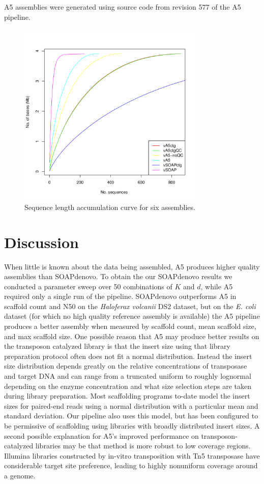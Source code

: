 \documentclass{bioinfo}
\begin{document}
A5 assemblies were generated using source code from revision 577 of the A5 pipeline.

\begin{figure}[t]
\includegraphics[width=3.5in]{volc_accum_plot.pdf}
\vspace{-1cm}
\caption{Sequence length accumulation curve for six assemblies.}\label{fig:03}
\end{figure}

\section{Discussion}

When little is known about the data being assembled, A5 produces higher quality assemblies 
than SOAPdenovo. To obtain the our SOAPdenovo results we conducted a parameter sweep 
over 50 combinations of $K$ and $d$, while A5 required
only a single run of the pipeline.
SOAPdenovo outperforms A5 in scaffold count and N50 on the \textit{Haloferax volcanii} DS2 dataset, but on the \textit{E. coli} dataset 
(for which no high quality reference assembly is available) the
A5 pipeline produces a better assembly when measured by scaffold count, mean scaffold size, and max scaffold size.
One possible reason that A5 may produce better results on the transposon catalyzed library is that the insert size using
that library preparation protocol often does not fit a normal distribution.  Instead the insert size 
distribution depends greatly on the relative concentrations of transposase and target DNA and can range from a truncated uniform
to roughly lognormal depending on the enzyme concentration and what size selection steps are taken during library preparation.
Most scaffolding programs to-date model the insert sizes for paired-end reads using a normal distribution with a particular
mean and standard deviation. Our pipeline also uses this model, but has been configured to be permissive of scaffolding
using libraries with broadly distributed insert sizes.  A second possible explanation for A5's improved performance on transposon-catalyzed 
libraries may be that method is more robust to low coverage regions.  Illumina libraries constructed by in-vitro 
transposition with Tn5 transposase have considerable target site preference, leading to highly nonuniform coverage around a genome.
\end{document}
